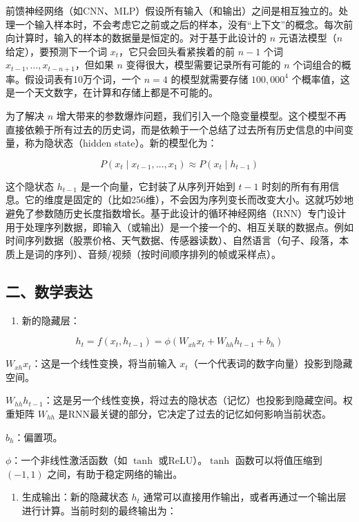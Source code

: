 前馈神经网络（如CNN、MLP）假设所有输入（和输出）之间是相互独立的。处理一个输入样本时，不会考虑它之前或之后的样本，没有``上下文''的概念。每次前向计算时，输入的样本的数据量是恒定的。对于基于此设计的 \(n\) 元语法模型（\(n\) 给定），要预测下一个词 \(x_t\)，它只会回头看紧挨着的前 \(n-1\) 个词 \(x_{t-1},\ldots,x_{t-n+1}\)，但如果 \(n\) 变得很大，模型需要记录所有可能的 \(n\) 个词组合的概率。假设词表有10万个词，一个 \(n=4\) 的模型就需要存储 \(100{,}000^4\) 个概率值，这是一个天文数字，在计算和存储上都是不可能的。

为了解决 \(n\) 增大带来的参数爆炸问题，我们引入一个隐变量模型。这个模型不再直接依赖于所有过去的历史词，而是依赖于一个总结了过去所有历史信息的中间变量，称为隐状态（hidden state）。新的模型化为：

\[
P(x_t \mid x_{t-1},\ldots,x_1) \approx P(x_t \mid h_{t-1})
\]

这个隐状态 \(h_{t-1}\) 是一个向量，它封装了从序列开始到 \(t-1\) 时刻的所有有用信息。它的维度是固定的（比如256维），不会因为序列变长而改变大小。这就巧妙地避免了参数随历史长度指数增长。基于此设计的循环神经网络（RNN）专门设计用于处理序列数据，即输入（或输出）是一个接一个的、相互关联的数据点。例如时间序列数据（股票价格、天气数据、传感器读数）、自然语言（句子、段落，本质上是词的序列）、音频/视频（按时间顺序排列的帧或采样点）。

\hypertarget{ux4e8cux6570ux5b66ux8868ux8fbe}{%
\subsection{二、数学表达}\label{ux4e8cux6570ux5b66ux8868ux8fbe}}

\begin{enumerate}
\def\labelenumi{\arabic{enumi}.}
\tightlist
\item
  新的隐藏层：
\end{enumerate}

\[
h_t=f(x_t,h_{t-1})=\phi(W_{xh}x_t+W_{hh}h_{t-1}+b_h)
\]

\(W_{xh}x_t\)：这是一个线性变换，将当前输入 \(x_t\)（一个代表词的数字向量）投影到隐藏空间。

\(W_{hh}h_{t-1}\)：这是另一个线性变换，将过去的隐状态（记忆）也投影到隐藏空间。权重矩阵 \(W_{hh}\) 是RNN最关键的部分，它决定了过去的记忆如何影响当前状态。

\(b_h\)：偏置项。

\(\phi\)：一个非线性激活函数（如 \(\tanh\) 或ReLU）。\(\tanh\) 函数可以将值压缩到 \((-1,1)\) 之间，有助于稳定网络的输出。

\begin{enumerate}
\def\labelenumi{\arabic{enumi}.}
\setcounter{enumi}{1}
\tightlist
\item
  生成输出：新的隐藏状态 \(h_t\) 通常可以直接用作输出，或者再通过一个输出层进行计算。当前时刻的最终输出为：
\end{enumerate}

